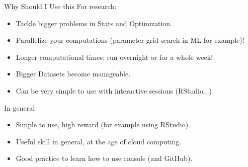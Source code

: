\documentclass{beamer}
\begin{document}
\begin{frame}{Why Should I Use this}
  For research:
  \begin{itemize}
    \item Tackle bigger problems in Stats and Optimization.
    \item Parallelize your computations (parameter grid search in ML for example)!
    \item Longer computational times: run overnight or for a whole week!
    \item Bigger Datasets become manageable.
    \item Can be very simple to use with interactive sessions (RStudio...)
  \end{itemize}
  In general
  \begin{itemize}
    \item Simple to use, high reward (for example using RStudio).
    \item Useful skill in general, at the age of cloud computing.
    \item Good practice to learn how to use console (and GitHub).
  \end{itemize}
\end{frame}
\end{document}
